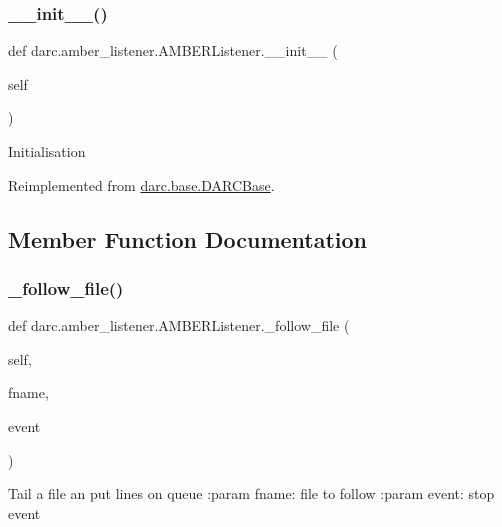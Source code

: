 \subsubsection{\texorpdfstring{\_\_init\_\_()}{\_\_init\_\_()}}
{\footnotesize\ttfamily def darc.\+amber\+\_\+listener.\+A\+M\+B\+E\+R\+Listener.\+\_\+\+\_\+init\+\_\+\+\_\+ (\begin{DoxyParamCaption}\item[{}]{self }\end{DoxyParamCaption})}

\begin{DoxyVerb}Initialisation
\end{DoxyVerb}
 

Reimplemented from \mbox{\hyperlink{classdarc_1_1base_1_1_d_a_r_c_base_ac14d433a0b0c403939d6a2f8271f56b4}{darc.\+base.\+D\+A\+R\+C\+Base}}.



\subsection{Member Function Documentation}
\mbox{\label{classdarc_1_1amber__listener_1_1_a_m_b_e_r_listener_ac053428a28ddbf92400c2a4888a737ee}} 
\subsubsection{\texorpdfstring{\_follow\_file()}{\_follow\_file()}}
{\footnotesize\ttfamily def darc.\+amber\+\_\+listener.\+A\+M\+B\+E\+R\+Listener.\+\_\+follow\+\_\+file (\begin{DoxyParamCaption}\item[{}]{self,  }\item[{}]{fname,  }\item[{}]{event }\end{DoxyParamCaption})\hspace{0.3cm}{\ttfamily [private]}}

\begin{DoxyVerb}Tail a file an put lines on queue
:param fname: file to follow
:param event: stop event
\end{DoxyVerb}
 \mbox{\label{classdarc_1_1amber__listener_1_1_a_m_b_e_r_listener_a153eb430fc7b0f2b7c0f9537379ac914}} 
